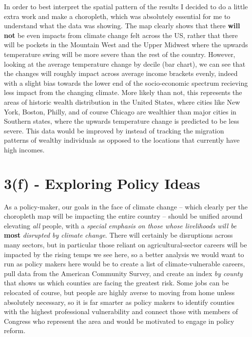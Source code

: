 \documentclass[
  letterpaper,
  DIV=11,
  numbers=noendperiod]{scrartcl}
\begin{document}
In order to best interpret the spatial pattern of the results I decided
to do a little extra work and make a choropleth, which was absolutely
essential for me to understand what the data was showing. The map
clearly shows that there \textbf{will not} be even impacts from climate
change felt across the US, rather that there will be pockets in the
Mountain West and the Upper Midwest where the upwards temperature swing
will be more severe than the rest of the country. However, looking at
the average temperature change by decile (bar chart), we can see that
the changes will roughly impact across average income brackets evenly,
indeed with a slight bias towards the lower end of the socio-economic
spectrum recieving less impact from the changing climate. More likely
than not, this represents the areas of historic wealth distribution in
the United States, where cities like New York, Boston, Philly, and of
course Chicago are wealthier than major cities in Southern states, where
the upwards temperature change is predicted to be less severe. This data
would be improved by instead of tracking the migration patterns of
wealthy individuals as opposed to the locations that currently have high
incomes.

\section{3(f) - Exploring Policy
Ideas}\label{f---exploring-policy-ideas}

As a policy-maker, our goals in the face of climate change -- which
clearly per the choropleth map will be impacting the entire country --
should be unified around elevating \emph{all} people, with a
\emph{special emphasis on those whose livelihoods will be} \textbf{most}
\emph{disrupted by climate change}. There will certainly be disruptions
across many sectors, but in particular those reliant on
agricultural-sector careers will be impacted by the rising temps we see
here, so a better analysis we would want to run as policy makers here
would be to create a list of climate-vulnerable careers, pull data from
the American Community Survey, and create an index \emph{by county} that
shows us which counties are facing the greatest risk. Some jobs can be
relocated of course, but people are highly averse to moving from home
unless absolutely necessary, so it is far smarter as policy makers to
identify counties with the highest professional vulnerability and
connect those with members of Congress who represent the area and would
be motivated to engage in policy reform.
\end{document}
